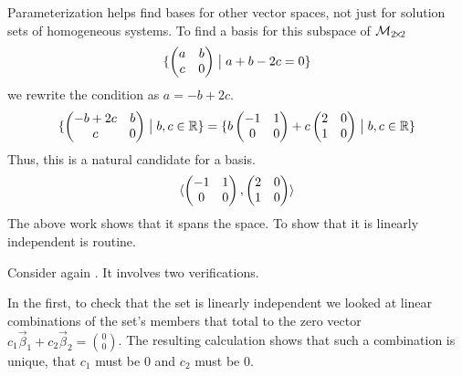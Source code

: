 \begin{example}
Parameterization helps find bases for other vector spaces, not just
for solution sets of homogeneous systems.
To find a basis for this subspace of $\mathcal{M}_{2 \! \times \! 2}$
\begin{equation*}
  \mbox{$\{\begin{pmatrix}
         a  &b  \\
         c  &0
       \end{pmatrix} \bigm| a+b-2c=0\}$}
\end{equation*}
we rewrite the condition as $a=-b+2c$.
\begin{equation*}
  \mbox{$\{\begin{pmatrix}
         -b+2c  &b  \\
          c     &0
       \end{pmatrix} \bigm| b,c \in \mathbb{R}\}$}
  =\mbox{$\{b\begin{pmatrix}
         -1  &1  \\
          0  &0
       \end{pmatrix}+
       c\begin{pmatrix}
          2  &0  \\
          1  &0
       \end{pmatrix} \bigm| b,c \in \mathbb{R}\}$}
\end{equation*}
Thus, this is a natural candidate for a basis.
\begin{equation*}
  \langle\begin{pmatrix}
         -1  &1  \\
          0  &0
       \end{pmatrix},
       \begin{pmatrix}
          2  &0  \\
          1  &0
       \end{pmatrix} \rangle
\end{equation*}
The above work shows that it spans the space.
To show that it is linearly independent is routine.
\end{example}

Consider again .
It involves two verifications.

In the first, to check that the set is linearly independent we looked at 
linear combinations of the set's members that total to
the zero vector 
$c_1\vec{\beta}_1+c_2\vec{\beta}_2=\binom{0}{0}$.
The resulting 
calculation shows that such a combination is unique,
that $c_1$ must be $0$ and $c_2$ must be $0$.

